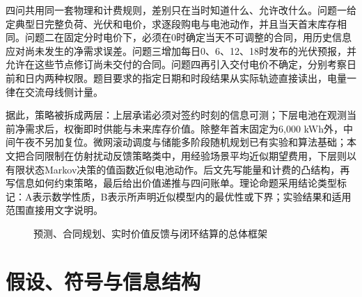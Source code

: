 \documentclass[UTF8,a4paper,zihao=-4,fontset=mac]{ctexart}
\begin{document}
四问共用同一套物理和计费规则，差别只在当时知道什么、允许改什么。问题一给定典型日完整负荷、光伏和电价，求逐段购电与电池动作，并且当天首末库存相同。问题二在固定分时电价下，必须在0时确定当天不可调整的合同，用历史信息应对尚未发生的净需求误差。问题三增加每日0、6、12、18时发布的光伏预报，并允许在这些节点修订尚未交付的合同。问题四再引入交付电价不确定，分别考察日前和日内两种权限。题目要求的指定日期和时段结果从实际轨迹直接读出，电量一律在交流母线侧计量。

据此，策略被拆成两层：上层承诺必须对签约时刻的信息可测；下层电池在观测当前净需求后，权衡即时供能与未来库存价值。除整年首末固定为6,000 kWh外，中间午夜不另加复位。微网滚动调度与储能多阶段随机规划已有实验和算法基础\cite{parisio2014,parisio2016,bhattacharya2018}；本文把合同限制在仿射扰动反馈策略类中\cite{bental2004,goulart2006}，用经验场景平均近似期望费用\cite{kleywegt2002,shapiro2014}，下层则以有限状态Markov决策的值函数近似电池动作\cite{puterman1994,powell2011}。后文先写能量和计费的凸结构，再写信息如何约束策略，最后给出价值递推与四问账单。理论命题采用结论类型标记：A表示数学性质，B表示所声明近似模型内的最优性或下界；实验结果和适用范围直接用文字说明。


\begin{figure}[H]\centering
{}
\caption{预测、合同规划、实时价值反馈与闭环结算的总体框架}
\end{figure}

\section{假设、符号与信息结构}
\end{document}
